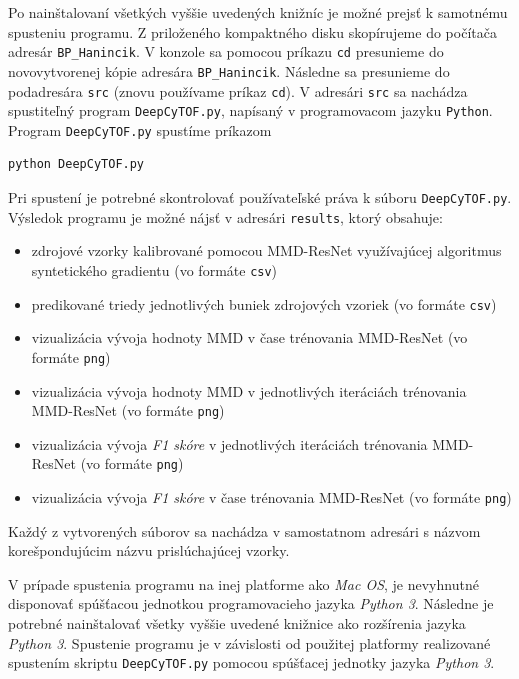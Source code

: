 \begin{sloppypar}
Po nainštalovaní všetkých vyššie uvedených knižníc je možné prejsť k samotnému spusteniu programu. Z priloženého kompaktného disku skopírujeme do počítača adresár \texttt{BP_Hanincik}. V konzole sa pomocou príkazu \texttt{cd} presunieme do novovytvorenej kópie adresára \texttt{BP_Hanincik}. Následne sa presunieme do podadresára \texttt{src} (znovu používame príkaz \texttt{cd}). V adresári \texttt{src} sa nachádza spustiteľný program \texttt{DeepCyTOF.py}, napísaný v programovacom jazyku \texttt{Python}. Program \texttt{DeepCyTOF.py} spustíme príkazom 
\end{sloppypar}

\begin{Verbatim}[breaklines=true, breakanywhere=true]
python DeepCyTOF.py
\end{Verbatim}

Pri spustení je potrebné skontrolovať používateľské práva k súboru \texttt{DeepCyTOF.py}. Výsledok programu je možné nájsť v adresári \texttt{results}, ktorý obsahuje:

\begin{itemize}
    \item zdrojové vzorky kalibrované pomocou MMD-ResNet využívajúcej algoritmus syntetického gradientu (vo formáte \texttt{csv})
    \item predikované triedy jednotlivých buniek zdrojových vzoriek (vo formáte \texttt{csv})
    \item vizualizácia vývoja hodnoty MMD v čase trénovania MMD-ResNet (vo formáte \texttt{png})
    \item vizualizácia vývoja hodnoty MMD v jednotlivých iteráciách trénovania MMD-ResNet (vo formáte \texttt{png})
    \item vizualizácia vývoja \textit{F1 skóre} v jednotlivých iteráciách trénovania MMD-ResNet (vo formáte \texttt{png})
    \item vizualizácia vývoja \textit{F1 skóre} v čase trénovania MMD-ResNet (vo formáte \texttt{png})
\end{itemize}

Každý z vytvorených súborov sa nachádza v samostatnom adresári s názvom korešpondujúcim názvu prislúchajúcej vzorky.

\begin{sloppypar}
V prípade spustenia programu na inej platforme ako \textit{Mac OS}, je nevyhnutné disponovať spúšťacou jednotkou programovacieho jazyka \textit{Python 3}. Následne je potrebné nainštalovať všetky vyššie uvedené knižnice ako rozšírenia jazyka \textit{Python 3}. Spustenie programu je v závislosti od použitej platformy realizované spustením skriptu \texttt{DeepCyTOF.py} pomocou spúšťacej jednotky jazyka \textit{Python 3}.
\end{sloppypar}


